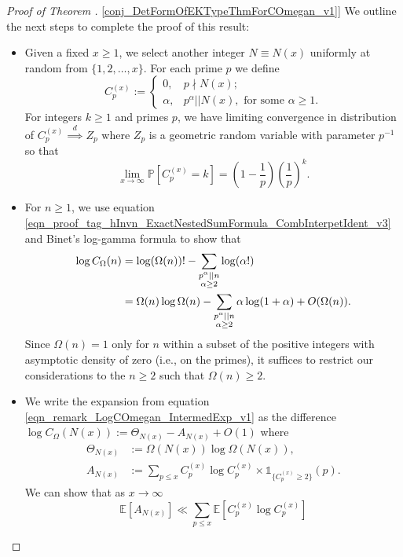 \documentclass[11pt,reqno,a4letter]{article}
\newcommand{\hlocalref}[1]{\hyperref[#1]{\ref{#1}}}
\numberwithin{equation}{section}
\numberwithin{figure}{section}
\numberwithin{table}{section}
\let\citep\cite
\theoremstyle{plain}
\numberwithin{theorem}{section}
\theoremstyle{definition}
\theoremstyle{remark}
\begin{document}
\begin{proof}[Proof of Theorem \hlocalref{conj_DetFormOfEKTypeThmForCOmegan_v1}]
We outline the next steps to complete the proof of this result: 
\begin{itemize}
\item
Given a fixed $x \geq 1$, we select another integer $N \equiv N(x)$ uniformly at random from 
$\{1,2,\ldots,x\}$. For each prime $p$ we define 
\[
C_p^{(x)} := \begin{cases} 0, & p \nmid N(x); \\ 
	\alpha, & p^{\alpha} || N(x), \text{ for some } \alpha \geq 1. 
	\end{cases}
\]
For integers $k \geq 1$ and primes $p$, we have limiting convergence in distribution of 
$C_p^{(x)} \overset{d}{\implies} Z_p$ where $Z_p$ is 
a geometric random variable with parameter $p^{-1}$ so that 
\citep[\S 1.2]{LOG-COMB-STRUCTS-BOOK} 
\[
\lim_{x \rightarrow \infty} \mathbb{P}\left[C_p^{(x)} = k\right] = 
     \left(1 - \frac{1}{p}\right)\left(\frac{1}{p}\right)^k. 
\]
\item 
For $n \geq 1$, we use 
equation \eqref{eqn_proof_tag_hInvn_ExactNestedSumFormula_CombInterpetIdent_v3} and 
Binet's log-gamma formula \cite[\S 5.9(i)]{NISTHB} to show that 
\begin{align}
\notag
\log C_{\Omega}(n) & = \log (\Omega(n))! - 
	\sum_{\substack{p^{\alpha}||n \\ \alpha \geq 2}} \log(\alpha!) \\ 
\label{eqn_remark_LogCOmegan_IntermedExp_v1}
	& = \Omega(n) \log \Omega(n) - \sum_{\substack{p^{\alpha}||n \\ \alpha \geq 2}} 
	\alpha \log(1 + \alpha) + O(\Omega(n)). 
\end{align}
Since $\Omega(n) = 1$ only for $n$ within a subset of the positive 
integers with asymptotic density of zero (i.e., on the primes), 
it suffices to restrict our considerations 
to the $n \geq 2$ such that $\Omega(n) \geq 2$. 
\item 
We write the expansion from equation 
\eqref{eqn_remark_LogCOmegan_IntermedExp_v1} as the difference 
$\log C_{\Omega}(N(x)) := \Theta_{N(x)} - A_{N(x)} + O(1)$ where 
\begin{align*}
\Theta_{N(x)} & := \Omega(N(x)) \log \Omega(N(x)), \\ 
A_{N(x)} & := \sum_{p \leq x} C_p^{(x)} \log C_p^{(x)} \times \mathds{1}_{\{C_p^{(x)} \geq 2\}}(p). 
\end{align*}
We can show that as $x \rightarrow \infty$ 
\[
\mathbb{E}[A_{N(x)}] \ll \sum_{p \leq x} \mathbb{E}\left[C_p^{(x)} \log C_p^{(x)}\right] 
\]
\end{itemize}
\end{proof}
\end{document}
